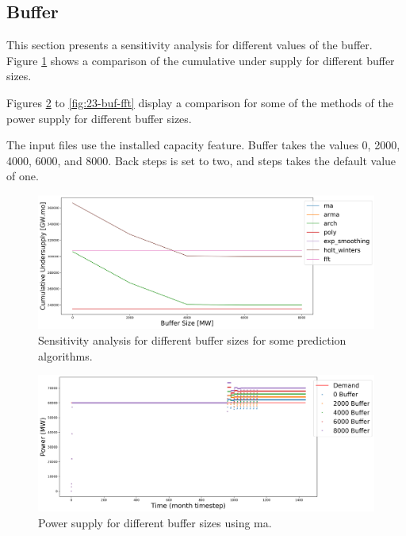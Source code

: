 \documentclass[11pt]{article}
\begin{document}
\subsection{Buffer}

This section presents a sensitivity analysis for different values of the buffer. Figure \ref{fig:23-buff} shows a comparison of the cumulative under supply for different buffer sizes.

Figures \ref{fig:23-buf-ma} to \ref{fig:23-buf-fft} display a comparison for some of the methods of the power supply for different buffer sizes.

The input files use the installed capacity feature. Buffer takes the values 0, 2000, 4000, 6000, and 8000. Back steps is set to two, and steps takes the default value of one.

\begin{figure}[!h]
	\centering
	\includegraphics[width=\textwidth]{23-figures/23-sens-buffer.png} 
	\hfill
	\caption{Sensitivity analysis for different buffer sizes for some prediction algorithms.}
	\label{fig:23-buff}
\end{figure}

\begin{figure}[!h]
	\centering
	\includegraphics[width=\textwidth]{23-figures/23-power-buffer-ma.png} 
	\hfill
	\caption{Power supply for different buffer sizes using ma.}
	\label{fig:23-buf-ma}
\end{figure}
\end{document}
